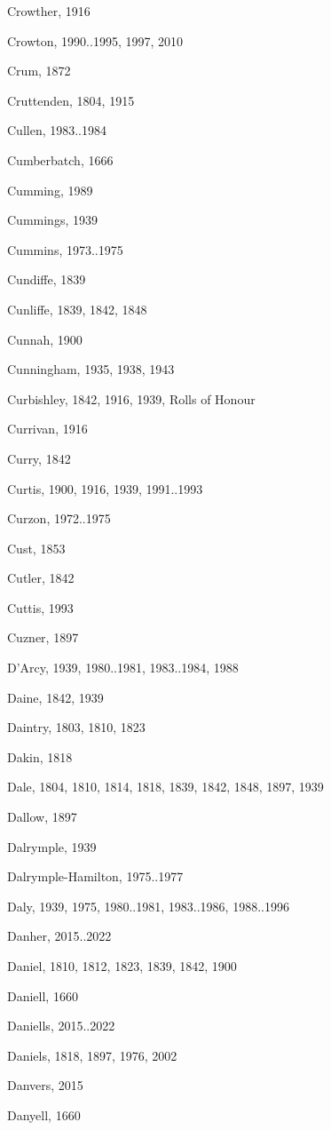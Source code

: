 \begin{theindex}
\item Crowther, 1916
\item Crowton, 1990..1995, 1997, 2010
\item Crum, 1872
\item Cruttenden, 1804, 1915
\item Cullen, 1983..1984
\item Cumberbatch, 1666
\item Cumming, 1989
\item Cummings, 1939
\item Cummins, 1973..1975
\item Cundiffe, 1839
\item Cunliffe, 1839, 1842, 1848
\item Cunnah, 1900
\item Cunningham, 1935, 1938, 1943
\item Curbishley, 1842, 1916, 1939, Rolls of Honour
\item Currivan, 1916
\item Curry, 1842
\item Curtis, 1900, 1916, 1939, 1991..1993
\item Curzon, 1972..1975
\item Cust, 1853
\item Cutler, 1842
\item Cuttis, 1993
\item Cuzner, 1897
\item D'Arcy, 1939, 1980..1981, 1983..1984, 1988
\item Daine, 1842, 1939
\item Daintry, 1803, 1810, 1823
\item Dakin, 1818
\item Dale, 1804, 1810, 1814, 1818, 1839, 1842, 1848, 1897, 1939
\item Dallow, 1897
\item Dalrymple, 1939
\item Dalrymple-Hamilton, 1975..1977
\item Daly, 1939, 1975, 1980..1981, 1983..1986, 1988..1996
\item Danher, 2015..2022
\item Daniel, 1810, 1812, 1823, 1839, 1842, 1900
\item Daniell, 1660
\item Daniells, 2015..2022
\item Daniels, 1818, 1897, 1976, 2002
\item Danvers, 2015
\item Danyell, 1660

\end{theindex}
